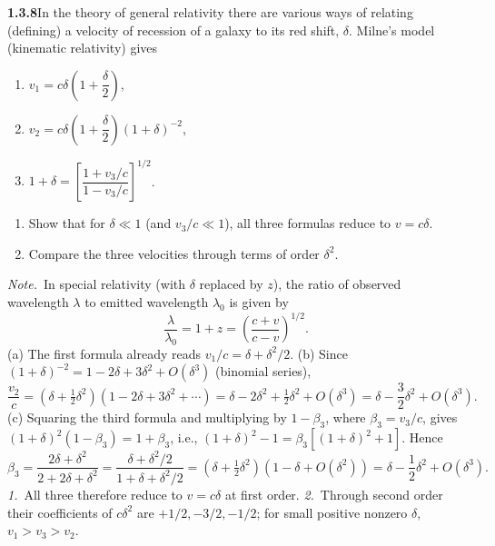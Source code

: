 \par\bigskip
\noindent\textbf{1.3.8}\quad In the theory of general relativity there are
various ways of relating (defining) a velocity of recession of a galaxy to its
red shift, $\delta$. Milne's model (kinematic relativity) gives
\begin{enumerate}
\item[(a)] $v_{1}=c\delta\left(1+\dfrac{\delta}{2}\right)$,
\item[(b)] $v_{2}=c\delta\left(1+\dfrac{\delta}{2}\right)(1+\delta)^{-2}$,
\item[(c)] $1+\delta=\left[\dfrac{1+v_{3}/c}{1-v_{3}/c}\right]^{1/2}$.
\end{enumerate}
\begin{enumerate}
\item[1.] Show that for $\delta\ll1$ (and $v_{3}/c\ll1$), all three formulas
  reduce to $v=c\delta$.
\item[2.] Compare the three velocities through terms of order $\delta^{2}$.
\end{enumerate}

\emph{Note.}~In special relativity (with $\delta$ replaced by $z$), the ratio
of observed wavelength $\lambda$ to emitted wavelength $\lambda_{0}$ is given
by
\[
\frac{\lambda}{\lambda_{0}}=1+z=\left(\frac{c+v}{c-v}\right)^{1/2}.
\]
\solution
(a) The first formula already reads $v_1/c=\delta+\delta^2/2$.
(b) Since $(1+\delta)^{-2}=1-2\delta+3\delta^2+O(\delta^3)$ (binomial
series),
\[
 \frac{v_2}{c}=(\delta+\tfrac12\delta^2)
       (1-2\delta+3\delta^2+\cdots)
       =\delta-2\delta^2+\tfrac12\delta^2+O(\delta^3)
       =\delta-\frac32\delta^2+O(\delta^3).
\]
(c) Squaring the third formula and multiplying by $1-\beta_3$, where
$\beta_3=v_3/c$, gives $(1+\delta)^2(1-\beta_3)=1+\beta_3$, i.e.,
$(1+\delta)^2-1=\beta_3[(1+\delta)^2+1]$. Hence
\[
 \beta_3=\frac{2\delta+\delta^2}{2+2\delta+\delta^2}
 =\frac{\delta+\delta^2/2}{1+\delta+\delta^2/2}
 =(\delta+\tfrac12\delta^2)(1-\delta+O(\delta^2))
 =\delta-\frac12\delta^2+O(\delta^3).
\]
\emph{1.}~All three therefore reduce to $v=c\delta$ at first order.
\emph{2.}~Through second order their coefficients of $c\delta^2$ are
$+1/2,-3/2,-1/2$; for small positive nonzero $\delta$, $v_1>v_3>v_2$.


